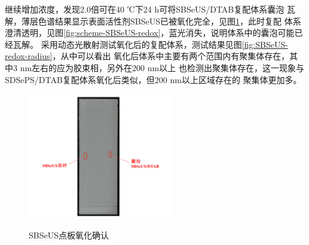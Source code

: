 \documentclass[bachelor,winfonts,replaceperiod]{jnuthesis}
\begin{document}
    继续增加浓度，发现2.0倍可在40 ℃下24 h可将SBSeUS/DTAB复配体系囊泡
    瓦解，薄层色谱结果显示表面活性剂SBSeUS已被氧化完全，见图\ref{fig:SBSeUS-Ox-tlc}，此时复配
    体系澄清透明，见图\ref{fig:scheme-SBSeUS-redox}，蓝光消失，说明体系中的囊泡可能已经瓦解。
    采用动态光散射测试氧化后的复配体系，测试结果见图\ref{fig:SBSeUS-redox-radius}，从中可以看出
    氧化后体系中主要有两个范围内有聚集体存在，其中3 nm左右的应为胶束相，另外在200 nm以上
    也检测出聚集体存在，这一现象与SDSePS/DTAB复配体系氧化后类似，但200 nm以上区域存在的
    聚集体更加多。
    \begin{figure}[htbp]
        \centering
        \includegraphics[height=5.5cm]{figure/SBSeUS-Ox-tlc}\\
        \caption{SBSeUS点板氧化确认}\label{fig:SBSeUS-Ox-tlc}
    \end{figure}
    
\end{document}
